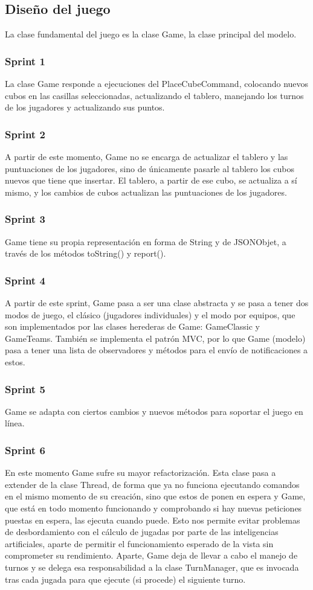 \documentclass{article}
\theoremstyle{break}
\begin{document}
\subsection{Diseño del juego}
La clase fundamental del juego es la clase Game, la clase principal del modelo.
\subsubsection{Sprint 1}
La clase Game responde a ejecuciones del PlaceCubeCommand, colocando nuevos cubos en las casillas seleccionadas, actualizando el tablero, manejando los turnos de los jugadores y actualizando sus puntos.
\subsubsection{Sprint 2}
A partir de este momento, Game no se encarga de actualizar el tablero y las puntuaciones de los jugadores, sino de únicamente pasarle al tablero los cubos nuevos que tiene que insertar. El tablero, a partir de ese cubo, se actualiza a sí mismo, y los cambios de cubos actualizan las puntuaciones de los jugadores.
\subsubsection{Sprint 3}
Game tiene su propia representación en forma de String y de JSONObjet, a través de los métodos toString() y report().
\subsubsection{Sprint 4}
A partir de este sprint, Game pasa a ser una clase abstracta y se pasa a tener dos modos de juego, el clásico (jugadores individuales) y el modo por equipos, que son implementados por las clases herederas de Game: GameClassic y GameTeams.
También se implementa el patrón MVC, por lo que Game (modelo) pasa a tener una lista de observadores y métodos para el envío de notificaciones a estos.
\subsubsection{Sprint 5}
Game se adapta con ciertos cambios y nuevos métodos para soportar el juego en línea.
\subsubsection{Sprint 6}
En este momento Game sufre su mayor refactorización. Esta clase pasa a extender de la clase Thread, de forma que ya no funciona ejecutando comandos en el mismo momento de su creación, sino que estos de ponen en espera y Game, que está en todo momento funcionando y comprobando si hay nuevas peticiones puestas en espera, las ejecuta cuando puede. Esto nos permite evitar problemas de desbordamiento con el cálculo de jugadas por parte de las inteligencias artificiales, aparte de permitir el funcionamiento esperado de la vista sin comprometer su rendimiento.
Aparte, Game deja de llevar a cabo el manejo de turnos y se delega esa responsabilidad a la clase TurnManager, que es invocada tras cada jugada para que ejecute (si procede) el siguiente turno.
\end{document}
